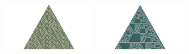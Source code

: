 \documentclass{article}
\begin{document}
\begin{figure}[ht!]
\noindent
\includegraphics[trim={800 0 800 0}, clip, width=4cm]{assets/128_problem/A253587_2022-12-01.png}
\includegraphics[trim={800 0 800 0}, clip, width=4cm]{assets/128_problem/A273899_2022_11-27.png}

\end{figure}
\end{document}
